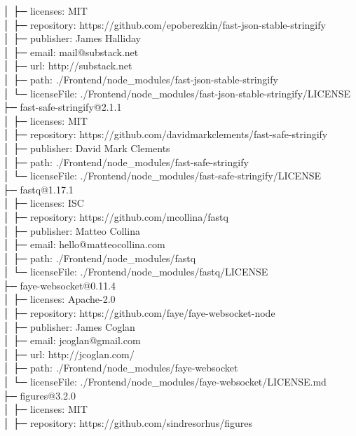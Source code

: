 │  ├─ licenses: MIT\\
│  ├─ repository: https://github.com/epoberezkin/fast-json-stable-stringify\\
│  ├─ publisher: James Halliday\\
│  ├─ email: mail@substack.net\\
│  ├─ url: http://substack.net\\
│  ├─ path: ./Frontend/node\_modules/fast-json-stable-stringify\\
│  └─ licenseFile: ./Frontend/node\_modules/fast-json-stable-stringify/LICENSE\\
├─ fast-safe-stringify@2.1.1\\
│  ├─ licenses: MIT\\
│  ├─ repository: https://github.com/davidmarkclements/fast-safe-stringify\\
│  ├─ publisher: David Mark Clements\\
│  ├─ path: ./Frontend/node\_modules/fast-safe-stringify\\
│  └─ licenseFile: ./Frontend/node\_modules/fast-safe-stringify/LICENSE\\
├─ fastq@1.17.1\\
│  ├─ licenses: ISC\\
│  ├─ repository: https://github.com/mcollina/fastq\\
│  ├─ publisher: Matteo Collina\\
│  ├─ email: hello@matteocollina.com\\
│  ├─ path: ./Frontend/node\_modules/fastq\\
│  └─ licenseFile: ./Frontend/node\_modules/fastq/LICENSE\\
├─ faye-websocket@0.11.4\\
│  ├─ licenses: Apache-2.0\\
│  ├─ repository: https://github.com/faye/faye-websocket-node\\
│  ├─ publisher: James Coglan\\
│  ├─ email: jcoglan@gmail.com\\
│  ├─ url: http://jcoglan.com/\\
│  ├─ path: ./Frontend/node\_modules/faye-websocket\\
│  └─ licenseFile: ./Frontend/node\_modules/faye-websocket/LICENSE.md\\
├─ figures@3.2.0\\
│  ├─ licenses: MIT\\
│  ├─ repository: https://github.com/sindresorhus/figures\\

